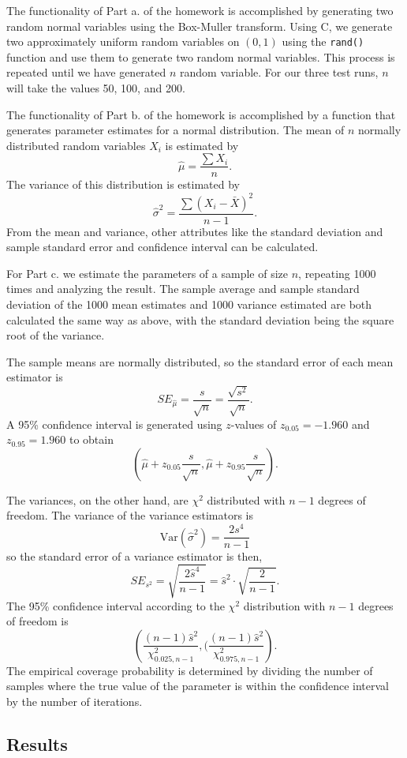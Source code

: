 \documentclass{article}
\begin{document}
The functionality of Part a. of the homework is accomplished by  generating two random normal variables using the Box-Muller transform. Using C, we generate two approximately uniform random variables on $(0, 1)$ using the \verb!rand()! function and use them to generate two random normal variables. This process is repeated until we have generated $n$ random variable. For our three test runs, $n$ will take the values 50, 100, and 200.

The functionality of Part b. of the homework is accomplished by a function that generates parameter estimates for a normal distribution. The mean of $n$ normally distributed random variables $X_i$ is estimated by $$\hat{\mu} = \frac{\sum{X_i}}{n}.$$ The variance of this distribution is estimated by $$\hat{\sigma}^2 = \frac{\sum(X_i-\bar{X})^2}{n-1}.$$ From the mean and variance, other attributes like the standard deviation and sample standard error and confidence interval can be calculated.

For Part c. we estimate the parameters of a sample of size $n$, repeating 1000 times and analyzing the result. The sample average and sample standard deviation of the 1000 mean estimates and 1000 variance estimated are both calculated the same way as above, with the standard deviation being the square root of the variance. 

The sample means are normally distributed, so the standard error of each mean estimator is $$SE_{\hat{\mu}} = \frac{s}{\sqrt{n}} = \frac{\sqrt{s^2}}{\sqrt{n}}.$$ A 95\% confidence interval is generated using $z$-values of $z_{0.05} = -1.960$ and $z_{0.95} = 1.960$ to obtain $$(\hat{\mu}+z_{0.05}\frac{s}{\sqrt{n}}, \hat{\mu}+z_{0.95}\frac{s}{\sqrt{n}}).$$ 

The variances, on the other hand, are $\chi^2$ distributed with $n-1$ degrees of freedom. The variance of the variance estimators is $$\text{Var}(\hat{\sigma}^2) = \frac{2s^4}{n-1}$$ so the standard error of a variance estimator is then, $$SE_{s^2} = \sqrt{\frac{2\hat{s}^4}{n-1}} = \hat{s}^2\cdot\sqrt{\frac{2}{n-1}}.$$ The 95\% confidence interval according to the $\chi^2$ distribution with $n-1$ degrees of freedom is $$\left(\frac{(n-1)\hat{s}^2}{\chi^2_{0.025, n-1}}, (\frac{(n-1)\hat{s}^2}{\chi^2_{0.975, n-1}}\right).$$
The empirical coverage probability is determined by dividing the number of samples where the true value of the parameter is within the confidence interval by the number of iterations. 


\subsection{Results}
\end{document}
